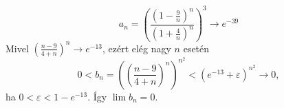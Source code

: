 \documentclass[11pt]{scrartcl}
\begin{document}
\[
	a_n
	= \left(
	\frac{\left(1 - \frac{9}{n}\right)^n}{\left(1 + \frac{4}{n}\right)^n}
	\right)^3
	\to e^{-39}
\]
Mivel
\(
\left( \frac{n - 9}{4 + n} \right)^n \to e^{-13}
\),
ezért elég nagy $n$ esetén
\[
	0 < b_n
	= \left( \left( \frac{n - 9}{4 + n} \right)^n \right)^{n^2}
	< \left( e^{-13} + \varepsilon \right)^{n^2}
	\to 0,
\]
ha $0 < \varepsilon < 1 - e^{-13}$. Így $\lim b_n = 0$.
\end{document}
